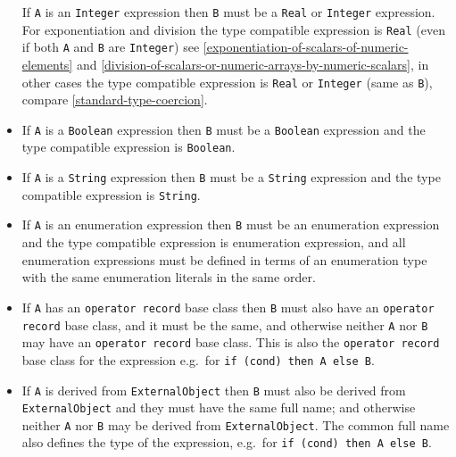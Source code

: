 \begin{itemize}
  If \lstinline!A! is an \lstinline!Integer! expression then \lstinline!B! must be a \lstinline!Real! or \lstinline!Integer!
  expression. For exponentiation and division the type compatible
  expression is \lstinline!Real! (even if both \lstinline!A! and \lstinline!B! are \lstinline!Integer!) see \cref{exponentiation-of-scalars-of-numeric-elements}
  and \cref{division-of-scalars-or-numeric-arrays-by-numeric-scalars}, in
  other cases the type compatible expression is \lstinline!Real! or \lstinline!Integer! (same as
  \lstinline!B!), compare \cref{standard-type-coercion}.
\item
  If \lstinline!A! is a \lstinline!Boolean! expression then \lstinline!B! must be a \lstinline!Boolean! expression and
  the type compatible expression is \lstinline!Boolean!.
\item
  If \lstinline!A! is a \lstinline!String! expression then \lstinline!B! must be a \lstinline!String! expression and the
  type compatible expression is \lstinline!String!.
\item
  If \lstinline!A! is an enumeration expression then \lstinline!B! must be an enumeration
  expression and the type compatible expression is enumeration
  expression, and all enumeration expressions must be defined in terms
  of an enumeration type with the same enumeration literals in the same
  order.
\item
  If \lstinline!A! has an \lstinline!operator record! base class then \lstinline!B! must also have an \lstinline!operator record! base class, and it must be the same, and otherwise neither \lstinline!A! nor \lstinline!B! may have an \lstinline!operator record! base class.
  This is also the \lstinline!operator record! base class for the expression e.g.\ for \lstinline!if (cond) then A else B!.
\item
  If \lstinline!A! is derived from \lstinline!ExternalObject! then \lstinline!B! must also be derived from
  \lstinline!ExternalObject! and they must have the same full name; and otherwise
  neither \lstinline!A! nor \lstinline!B! may be derived from \lstinline!ExternalObject!. The common full
  name also defines the type of the expression, e.g.\ for \lstinline!if (cond) then A else B!.
\end{itemize}

